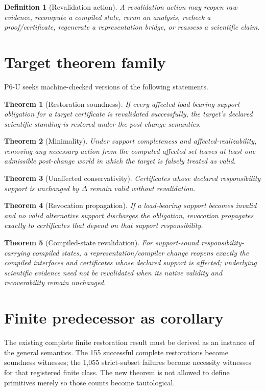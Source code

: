 \documentclass[11pt]{article}
\newtheorem{theorem}{Theorem}
\newtheorem{definition}{Definition}
\begin{document}
\begin{definition}[Revalidation action]
A revalidation action may reopen raw evidence, recompute a compiled state, rerun an analysis, recheck a proof/certificate, regenerate a representation bridge, or reassess a scientific claim.
\end{definition}

\section{Target theorem family}
P6-U seeks machine-checked versions of the following statements.

\begin{theorem}[Restoration soundness]
If every affected load-bearing support obligation for a target certificate is revalidated successfully, the target's declared scientific standing is restored under the post-change semantics.
\end{theorem}

\begin{theorem}[Minimality]
Under support completeness and affected-realizability, removing any necessary action from the computed affected set leaves at least one admissible post-change world in which the target is falsely treated as valid.
\end{theorem}

\begin{theorem}[Unaffected conservativity]
Certificates whose declared responsibility support is unchanged by $\Delta$ remain valid without revalidation.
\end{theorem}

\begin{theorem}[Revocation propagation]
If a load-bearing support becomes invalid and no valid alternative support discharges the obligation, revocation propagates exactly to certificates that depend on that support responsibility.
\end{theorem}

\begin{theorem}[Compiled-state revalidation]
For support-sound responsibility-carrying compiled states, a representation/compiler change reopens exactly the compiled interfaces and certificates whose declared support is affected; underlying scientific evidence need not be revalidated when its native validity and recoverability remain unchanged.
\end{theorem}

\section{Finite predecessor as corollary}
The existing complete finite restoration result must be derived as an instance of the general semantics. The 155 successful complete restorations become soundness witnesses; the 1,055 strict-subset failures become necessity witnesses for that registered finite class. The new theorem is not allowed to define primitives merely so those counts become tautological.
\end{document}
